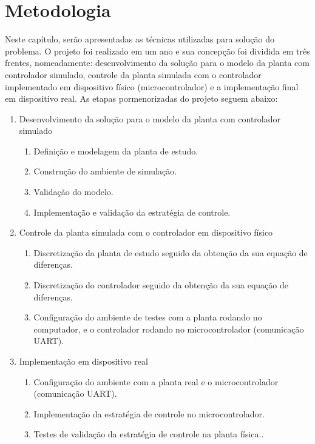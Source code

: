 \chapter{Metodologia}

Neste capítulo, serão apresentadas as técnicas utilizadas para solução do problema. O projeto 
foi realizado em um ano e sua concepção foi dividida em três frentes, nomeadamente: desenvolvimento 
da solução para o modelo da planta com controlador simulado, controle da planta simulada com o 
controlador implementado em dispositivo físico (microcontrolador) e a implementação final em dispositivo real. 
As etapas pormenorizadas do projeto seguem abaixo:

\begin{enumerate}
 \item Desenvolvimento da solução para o modelo da planta com controlador simulado
  \begin{enumerate}
    \item Definição e modelagem da planta de estudo.
    \item Construção do ambiente de simulação.
    \item Validação do modelo.
    \item Implementação e validação da estratégia de controle.
  \end{enumerate}
 \item Controle da planta simulada com o controlador em dispositivo físico
  \begin{enumerate}
    \item Discretização da planta de estudo seguido da obtenção da sua equação de diferenças.
    \item Discretização do controlador seguido da obtenção da sua equação de diferenças.
    \item Configuração do ambiente de testes com a planta rodando no computador, e o 
    controlador rodando no microcontrolador (comunicação UART).
  \end{enumerate}
  \item Implementação em dispositivo real
  \begin{enumerate}
    \item Configuração do ambiente com a planta real e o microcontrolador (comunicação UART).
    \item Implementação da estratégia de controle no microcontrolador.
    \item Testes de validação da estratégia de controle na planta física..
  \end{enumerate}
\end{enumerate}

